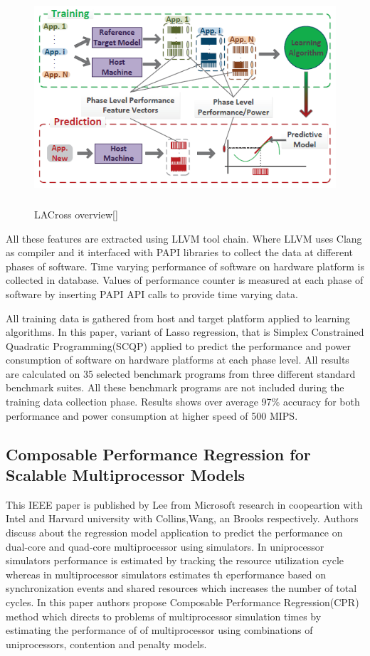 \begin{figure}[h!]
\includegraphics[width=12cm, height=8cm]{./images/ieee2}
\centering
\caption{LACross overview[]}
\label{fig:paper2}
\end{figure}

\par All these features are extracted using LLVM tool chain. Where LLVM uses Clang as compiler and it interfaced with PAPI libraries to collect the data at different phases of software. Time varying performance of software on hardware platform is collected in database. Values of performance counter is measured at each phase of software by inserting PAPI API calls to provide time varying data. 

\par All training data is gathered from host and target platform applied to learning algorithms. In this paper, variant of Lasso regression, that is Simplex Constrained Quadratic Programming(SCQP) applied to predict the performance and power consumption of software on hardware platforms at each phase level. All results are calculated on 
35 selected benchmark programs from three different standard benchmark suites. All these benchmark programs are not included during the training data collection phase. 
Results shows over average 97\% accuracy for both performance and power consumption at higher speed of 500 MIPS. 

\subsection{Composable Performance Regression for Scalable Multiprocessor Models}
This IEEE paper is published by Lee from Microsoft research in coopeartion with Intel and Harvard university with Collins,Wang, an Brooks respectively. Authors discuss about the regression model application to predict the performance on dual-core and quad-core multiprocessor using simulators. In uniprocessor simulators performance is estimated by tracking the resource utilization cycle whereas in multiprocessor simulators estimates th eperformance based on synchronization events and shared resources which increases the number of total cycles. In this paper authors propose Composable Performance Regression(CPR) method which directs to problems of multiprocessor simulation times by estimating the performance of of multiprocessor using combinations of uniprocessors, contention and penalty models. 

